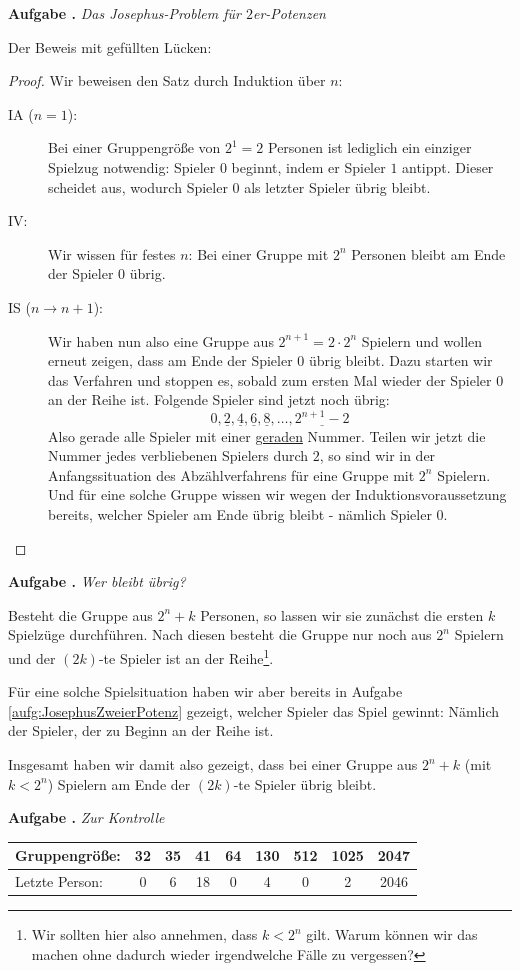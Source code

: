 \documentclass[a4paper,ngerman,12pt]{scrartcl}
\theoremstyle{definition}
\theoremstyle{plain}
\theoremstyle{remark}
\newlength{\aufgabenskip}
\newcounter{aufgabennummer}
\newenvironment{aufgabe}[1]{
	\addtocounter{aufgabennummer}{1}
	\textbf{Aufgabe \theaufgabennummer.} \emph{#1} \par
}{\vspace{\aufgabenskip}}
\begin{document}
\begin{aufgabe}{Das Josephus-Problem für $2$er-Potenzen}\label{aufg:JosephusZweierPotenz}
Der Beweis mit gefüllten Lücken:
\begin{proof}
	Wir beweisen den Satz durch Induktion über $n$:
	\begin{description}
		\item[IA ($n=1$):] Bei einer Gruppengröße von $2^1=2$ Personen ist lediglich ein einziger Spielzug notwendig: Spieler $0$ beginnt, indem er Spieler $1$ antippt. Dieser scheidet aus, wodurch Spieler $0$ als letzter Spieler übrig bleibt.
		\item[IV:] Wir wissen für festes $n$: Bei einer Gruppe mit $2^n$ Personen bleibt am Ende der Spieler $0$ übrig.
		\item[IS ($n\to n+1$):] Wir haben nun also eine Gruppe aus $2^{n+1} = 2\cdot 2^n$ Spielern und wollen erneut zeigen, dass am Ende der Spieler $0$ übrig bleibt. Dazu starten wir das Verfahren und stoppen es, sobald zum ersten Mal wieder der Spieler $0$ an der Reihe ist. Folgende Spieler sind jetzt noch übrig:
		\[0, \underline{2}, \underline{4}, \underline{6}, \underline{8}, \dots , \underline{2^{n+1}-2}\]
		Also gerade alle Spieler mit einer \underline{geraden} Nummer. Teilen wir jetzt die Nummer jedes verbliebenen Spielers durch $2$, so sind wir in der Anfangssituation des Abzählverfahrens für eine Gruppe mit \underline{$2^n$} Spielern. Und für eine solche Gruppe wissen wir wegen der Induktionsvoraussetzung bereits, welcher Spieler am Ende übrig bleibt - nämlich Spieler \underline{$0$}. \qedhere
	\end{description}
\end{proof}
\end{aufgabe}

\begin{aufgabe}{Wer bleibt übrig?}
	Besteht die Gruppe aus $2^n + k$ Personen, so lassen wir sie zunächst die ersten $k$ Spielzüge durchführen. Nach diesen besteht die Gruppe nur noch aus $2^n$ Spielern und der $(2k)$-te Spieler ist an der Reihe\footnote{Wir sollten hier also annehmen, dass $k < 2^n$ gilt. Warum können wir das machen ohne dadurch wieder irgendwelche Fälle zu vergessen?}. 
	
	Für eine solche Spielsituation haben wir aber bereits in Aufgabe \ref{aufg:JosephusZweierPotenz} gezeigt, welcher Spieler das Spiel gewinnt: Nämlich der Spieler, der zu Beginn an der Reihe ist.
	
	Insgesamt haben wir damit also gezeigt, dass bei einer Gruppe aus $2^n + k$ (mit $k < 2^n$) Spielern am Ende der $(2k)$-te Spieler übrig bleibt.
\end{aufgabe}

\begin{aufgabe}{Zur Kontrolle}
	\begin{center}
		\renewcommand{\arraystretch}{2}\setlength{\tabcolsep}{1em}
		\begin{tabular}{l||c|c|c|c|c|c|c|c}
			Gruppengröße:	& 32 & 35 & 41 & 64 & 130 & 512 & 1025 & 2047 \\\hline
			Letzte Person:	& 0  & 6  & 18 & 0  & 4   & 0   & 2    & 2046    
		\end{tabular}
	\end{center}	
\end{aufgabe}
\end{document}
